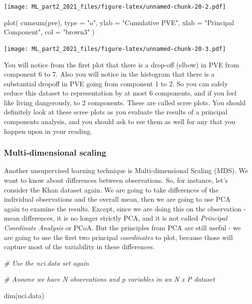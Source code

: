 \documentclass[
]{article}
\newenvironment{Shaded}{\begin{snugshade}}{\end{snugshade}}
\newcommand{\AttributeTok}[1]{\textcolor[rgb]{0.77,0.63,0.00}{#1}}
\newcommand{\CommentTok}[1]{\textcolor[rgb]{0.56,0.35,0.01}{\textit{#1}}}
\newcommand{\FunctionTok}[1]{\textcolor[rgb]{0.00,0.00,0.00}{#1}}
\newcommand{\NormalTok}[1]{#1}
\newcommand{\StringTok}[1]{\textcolor[rgb]{0.31,0.60,0.02}{#1}}
\begin{document}
\texttt{[image: ML\_part2\_2021\_files/figure-latex/unnamed-chunk-20-2.pdf]}

\begin{Shaded}
\begin{Highlighting}[]
\FunctionTok{plot}\NormalTok{(}
  \FunctionTok{cumsum}\NormalTok{(pve),}
  \AttributeTok{type =} \StringTok{"o"}\NormalTok{,}
  \AttributeTok{ylab =} \StringTok{"Cumulative PVE"}\NormalTok{,}
  \AttributeTok{xlab =} \StringTok{"Principal Component"}\NormalTok{,}
  \AttributeTok{col =} \StringTok{"brown3"}
\NormalTok{)}
\end{Highlighting}
\end{Shaded}

\texttt{[image: ML\_part2\_2021\_files/figure-latex/unnamed-chunk-20-3.pdf]}

You will notice from the first plot that there is a drop-off (elbow) in
PVE from component 6 to 7. Also you will notice in the histogram that
there is a substantial dropoff in PVE going from component 1 to 2. So
you can safely reduce this dataset to representation by at most 6
components, and if you feel like living dangerously, to 2 components.
These are called scree plots. You should definitely look at these scree
plots as you evaluate the results of a principal components analysis,
and you should ask to see them as well for any that you happen upon in
your reading.

\hypertarget{multi-dimensional-scaling}{%
\subsubsection{Multi-dimensional
scaling}\label{multi-dimensional-scaling}}

Another unsupervised learning technique is Multi-dimensional Scaling
(MDS). We want to know about differences between observations. So, for
instance, let's consider the Khan dataset again. We are going to take
differences of the individual observations and the overall mean, then we
are going to use PCA again to examine the results. Except, since we are
doing this on the observation - mean differences, it is no longer
strictly PCA, and it is not called \emph{Principal Coordinate Analysis}
or PCoA. But the principles from PCA are still useful - we are going to
use the first two principal \emph{coordinates} to plot, because those
will capture most of the variability in these differences.

\begin{Shaded}
\begin{Highlighting}[]
\CommentTok{\# Use the nci.data set again}

\CommentTok{\# Assume we have N observations and p variables in an N x P dataset}

\FunctionTok{dim}\NormalTok{(nci.data)}
\end{Highlighting}
\end{Shaded}
\end{document}
